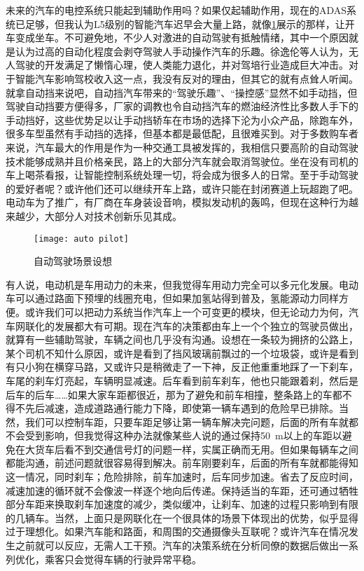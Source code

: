 \documentclass[UTF8]{ctexart}
\numberwithin{figure}{section}
\numberwithin{table}{section}
\begin{document}
未来的汽车的电控系统只能起到辅助作用吗？如果仅起辅助作用，现在的ADAS系统已足够，但我认为L5级别的智能汽车迟早会大量上路，就像\cref{auto pilot}展示的那样，让开车变成坐车。不可避免地，不少人对激进的自动驾驶有抵触情绪，其中一个原因就是认为过高的自动化程度会剥夺驾驶人手动操作汽车的乐趣。徐逸伦等人认为，无人驾驶的开发满足了懒惰心理，使人类能力退化，并对驾培行业造成巨大冲击。对于智能汽车影响驾校收入这一点，我没有反对的理由，但其它的就有点耸人听闻。就拿自动挡来说吧，自动挡汽车带来的“驾驶乐趣”、“操控感”显然不如手动挡，但驾驶自动挡要方便得多，厂家的调教也令自动挡汽车的燃油经济性比多数人手下的手动挡好，这些优势足以让手动挡轿车在市场的选择下沦为小众产品，除跑车外，很多车型虽然有手动挡的选择，但基本都是最低配，且很难买到。对于多数购车者来说，汽车最大的作用是作为一种交通工具被发挥的，我相信只要高阶的自动驾驶技术能够成熟并且价格亲民，路上的大部分汽车就会取消驾驶位。坐在没有司机的车上喝茶看报，让智能控制系统处理一切，将会成为很多人的日常。至于手动驾驶的爱好者呢？或许他们还可以继续开车上路，或许只能在封闭赛道上玩超跑了吧。电动车为了推广，有厂商在车身装设音响，模拟发动机的轰鸣，但现在这种行为越来越少，大部分人对技术创新乐见其成。

\begin{figure}[htbp]
	\centering
	\begin{minipage}[b]{0.6\textwidth}
		\centering
		\texttt{[image: auto pilot]}
		\caption{自动驾驶场景设想}
		\label{auto pilot}
	\end{minipage}
\end{figure}

有人说，电动机是车用动力的未来，但我觉得车用动力完全可以多元化发展。电动车可以通过路面下预埋的线圈充电，但如果加氢站得到普及，氢能源动力同样方便。或许我们可以把动力系统当作汽车上一个可变更的模块，但无论动力为何，汽车网联化的发展都大有可期。现在汽车的决策都由车上一个个独立的驾驶员做出，就算有一些辅助驾驶，车辆之间也几乎没有沟通。设想在一条较为拥挤的公路上，某个司机不知什么原因，或许是看到了挡风玻璃前飘过的一个垃圾袋，或许是看到有只小狗在横穿马路，又或许只是稍微走了一下神，反正他重重地踩了一下刹车，车尾的刹车灯亮起，车辆明显减速。后车看到前车刹车，他也只能跟着刹，然后是后车的后车……如果大家车距都很近，那为了避免和前车相撞，整条路上的车都不得不先后减速，造成道路通行能力下降，即使第一辆车遇到的危险早已排除。当然，我们可以控制车距，只要车距足够让第一辆车解决完问题，后面的所有车就都不会受到影响，但我觉得这种办法就像某些人说的通过保持\SI{50}{\meter}以上的车距以避免在大货车后看不到交通信号灯的问题一样，实属正确而无用。但如果每辆车之间都能沟通，前述问题就很容易得到解决。前车刚要刹车，后面的所有车就都能得知这一情况，同时刹车；危险排除，前车加速时，后车同步加速。省去了反应时间，减速加速的循环就不会像波一样逐个地向后传递。保持适当的车距，还可通过牺牲部分车距来换取刹车加速度的减少，类似缓冲，让刹车、加速的过程只影响到有限的几辆车。当然，上面只是网联化在一个很具体的场景下体现出的优势，似乎显得过于理想化。如果汽车能和路面，和周围的交通摄像头互联呢？或许汽车在情况发生之前就可以反应，无需人工干预。汽车的决策系统在分析同僚的数据后做出一系列优化，乘客只会觉得车辆的行驶异常平稳。
\end{document}
